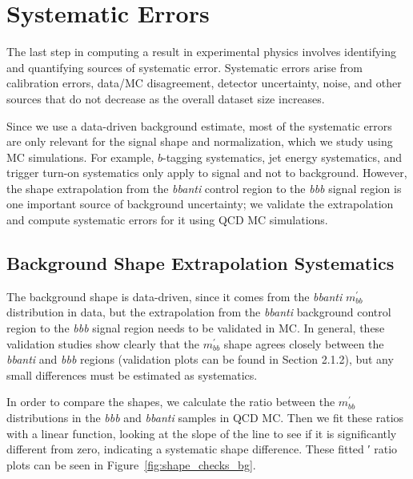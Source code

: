 

\chapter[Systematic Errors]{Systematic Errors}

The last step in computing a result in experimental physics involves identifying
and quantifying sources of systematic error.  Systematic errors arise from calibration
errors, data/MC disagreement, detector uncertainty, noise, and other sources
that do not decrease as the overall dataset size increases.  

Since we use a data-driven background estimate, most of the systematic errors
are only relevant for the signal shape and normalization, which we study using 
MC simulations.  For example, $b$-tagging systematics, jet energy systematics, 
and trigger turn-on systematics only apply to signal and not to background.  
However, the shape extrapolation from the \textit{bbanti} control region to the
\textit{bbb} signal region is one important source of background uncertainty;
we validate the extrapolation and compute systematic errors for it using QCD MC simulations.

\section{Background Shape Extrapolation Systematics}
\label{sec:background_syst}
The background shape is data-driven, since it comes from the \textit{bbanti} $m^{'}_{bb}$ distribution in data, but the
extrapolation from the \textit{bbanti} background control region to the \textit{bbb} signal region needs to be validated
in MC. In general, these validation studies show clearly that the $m^{'}_{bb}$ shape agrees closely between the
\textit{bbanti} and \textit{bbb} regions (validation plots can be found in Section 2.1.2), but any small differences must
be estimated as systematics.

In order to compare the shapes, we calculate the ratio between the $m^{'}_{bb}$ distributions in the \textit{bbb} and
\textit{bbanti} samples in QCD MC. Then we fit these ratios with a linear function, looking at the slope of the
line to see if it is significantly different from zero, indicating a systematic shape difference. These fitted ′
ratio plots can be seen in Figure~\ref{fig:shape_checks_bg}.


